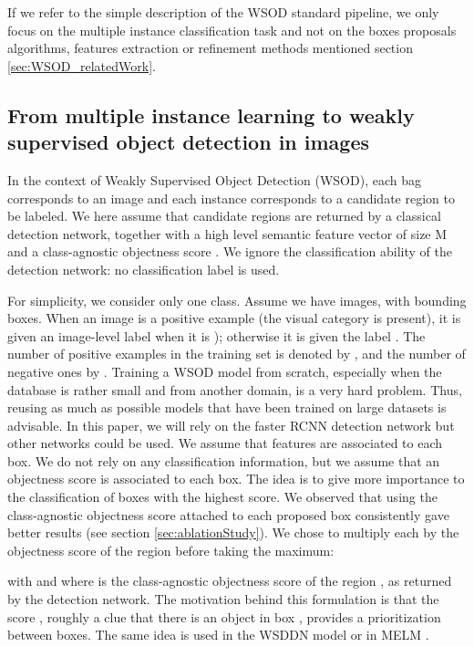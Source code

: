 \documentclass[preprint]{elsarticle}
\begin{document}
 If we refer to the simple description of the WSOD standard pipeline, we only focus on the multiple instance classification task and not on the boxes proposals algorithms, features extraction or refinement methods mentioned section \ref{sec:WSOD_relatedWork}.



 

\subsection{From multiple instance learning to weakly supervised object detection in images} 
\label{sec:objectTrick} 




In the context of Weakly Supervised Object Detection (WSOD), each bag  corresponds to an image and each instance  corresponds to a candidate region to be labeled. We here assume that candidate regions are returned by a classical detection network, together with a high level semantic feature vector of size M  and a class-agnostic objectness score . We ignore the classification ability of the detection network: no classification label is used.

For simplicity, we consider only one class.
Assume we have  images, with  bounding boxes. When an image is a positive example (the visual category is present), it is given an image-level label  when it is ); otherwise it is given the label  . The number of positive examples in the training set is denoted by , and the number of negative ones by .
Training a WSOD model from scratch, especially when the database is rather small and from another domain, is a very hard problem. Thus, reusing as much as possible models that have been trained on large datasets is advisable. In this paper, we will rely on the faster RCNN detection network but other networks could be used. We assume that features are associated to each box. We do not rely on any classification information, but we assume that an objectness score is associated to each box. The idea is to give more importance to the classification of boxes with the highest score. We observed that using the class-agnostic objectness score attached to each proposed box consistently gave better results (see section \ref{sec:ablationStudy}).  We chose to multiply each  by the objectness score of the region  before taking the maximum:


with  and where  is the class-agnostic objectness score of the region , as returned by the detection network. 
The motivation behind this formulation is that the score , roughly a  clue that there is an object in box , provides a prioritization between boxes. The same idea is used in the WSDDN model \citep{bilen_weakly_2016} or in MELM \citep{wan_minentropy_2018}. 
\end{document}
